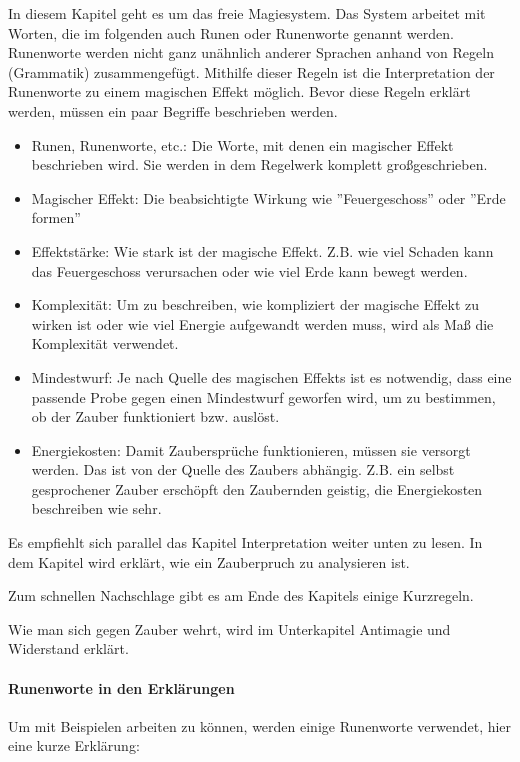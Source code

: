 \documentclass{article}
\begin{document}
In diesem Kapitel geht es um das freie Magiesystem. Das System arbeitet mit Worten, die im folgenden auch Runen oder
Runenworte genannt werden. Runenworte werden nicht ganz unähnlich anderer Sprachen anhand von Regeln (Grammatik)
zusammengefügt. Mithilfe dieser Regeln ist die Interpretation der Runenworte zu einem magischen Effekt möglich.
Bevor diese Regeln erklärt werden, müssen ein paar Begriffe beschrieben werden.

\begin{itemize}
\item Runen, Runenworte, etc.: Die Worte, mit denen ein magischer Effekt beschrieben wird. Sie werden in dem Regelwerk komplett großgeschrieben.
\item Magischer Effekt: Die beabsichtigte Wirkung wie ''Feuergeschoss'' oder ''Erde formen''
\item Effektstärke: Wie stark ist der magische Effekt. Z.B. wie viel Schaden kann das Feuergeschoss verursachen oder wie viel Erde kann bewegt werden.
\item Komplexität: Um zu beschreiben, wie kompliziert der magische Effekt zu wirken ist oder wie viel Energie aufgewandt werden muss, wird als Maß die Komplexität verwendet.
\item Mindestwurf: Je nach Quelle des magischen Effekts ist es notwendig, dass eine passende Probe gegen einen Mindestwurf geworfen wird, um zu bestimmen, ob der Zauber funktioniert bzw. auslöst.
\item Energiekosten: Damit Zaubersprüche funktionieren, müssen sie versorgt werden. Das ist von der Quelle des Zaubers abhängig. Z.B. ein selbst gesprochener Zauber erschöpft den Zaubernden geistig, die Energiekosten beschreiben wie sehr.
\end{itemize}

Es empfiehlt sich parallel das Kapitel Interpretation weiter unten zu lesen. In dem Kapitel wird erklärt, wie ein Zauberpruch
zu analysieren ist.

Zum schnellen Nachschlage gibt es am Ende des Kapitels einige Kurzregeln.

Wie man sich gegen Zauber wehrt, wird im Unterkapitel Antimagie und Widerstand erklärt.

\paragraph{Runenworte in den Erklärungen}

Um mit Beispielen arbeiten zu können, werden einige Runenworte verwendet, hier eine kurze Erklärung:
\end{document}
